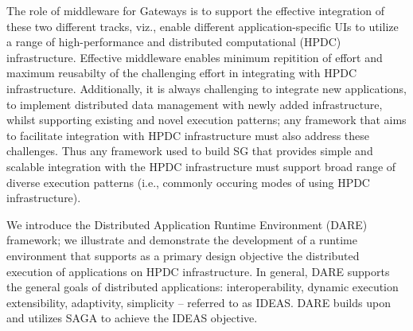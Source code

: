 \documentclass[]{svjour3}
\begin{document}
The role of middleware for Gateways is to support the effective
integration of these two different tracks, viz., enable different
application-specific UIs to utilize a range of high-performance and
distributed computational (HPDC) infrastructure.  Effective middleware
enables minimum repitition of effort and maximum reusabilty of the
challenging effort in integrating with HPDC infrastructure.
Additionally, it is always challenging to integrate new applications,
to implement distributed data management with newly added
infrastructure, whilst supporting existing and novel execution
patterns; any framework that aims to facilitate integration with HPDC
infrastructure must also address these challenges.  Thus any framework
used to build SG that provides simple and scalable integration with
the HPDC infrastructure must support broad range of diverse execution
patterns (i.e., commonly occuring modes of using HPDC infrastructure).








We introduce the Distributed Application Runtime Environment (DARE)
framework; we illustrate and demonstrate the development of a runtime
environment that supports as a primary design objective the
distributed execution of applications on HPDC infrastructure.  In
general, DARE supports the general goals of distributed applications:
interoperability, dynamic execution %
extensibility, adaptivity, simplicity -- referred to as
IDEAS\cite{ideas}.  DARE builds upon and utilizes SAGA to achieve the
IDEAS objective.
\end{document}
